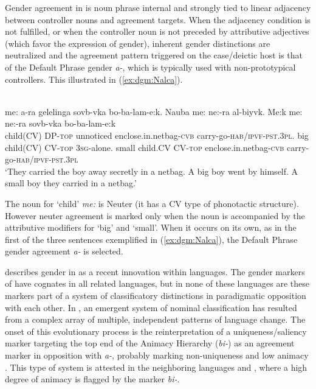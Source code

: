 \documentclass[output=collectionpaper]{langsci/langscibook}
\begin{document}
Gender agreement in  is noun phrase internal and strongly tied to linear adjacency between controller nouns and agreement targets. When the adjacency condition is not fulfilled, or when the controller noun is not preceded by attributive adjectives (which favor the expression of gender), inherent gender distinctions are neutralized and the agreement pattern triggered on the case/deictic host is that of the Default Phrase gender \textit{a-}, which is typically used with non-prototypical controllers. This illustrated in (\ref{ex:dgm:Nalca}).

\ea\label{ex:dgm:Nalca}
\\
\gll me: a-ra gelelinga sovb-vka bo-ba-lam-e:k. Nauba me: ne:-ra al-biyvk. Me:k me: ne:-ra sovb-vka bo-ba-lam-e:k\\
child(\textsc{CV}) \textsc{DP-top} unnoticed enclose.in.netbag-\textsc{cvb} carry-go-\textsc{hab/ipvf-pst.3pl}. big child(\textsc{CV}) \textsc{CV-top} \textsc{3sg-}alone. small child.\textsc{CV} \textsc{CV-top} enclose.in.netbag-\textsc{cvb} carry-go-\textsc{hab/ipvf-pst.3pl}\\
\glt `They carried the boy away secretly in a netbag. A big boy went by himself. A small boy they carried in a netbag.'\\
\z

The  noun for `child' \textit{me:} is Neuter (it has a CV type of phonotactic structure). However neuter agreement is marked only when the noun is accompanied by the attributive modifiers for `big' and `small'. When it occurs on its own, as in the first of the three sentences exemplified in (\ref{ex:dgm:Nalca}),  the Default Phrase gender agreement \textit{a-} is selected.


\citet{Waelchli2018} describes gender in  as a recent innovation within  languages. The gender markers of  have cognates in all related  languages, but in none of these languages are these markers part of a system of classificatory distinctions in paradigmatic opposition with each other. In , an emergent system of nominal classification has resulted from a complex array of multiple, independent patterns of language change. The onset of this evolutionary process is the reinterpretation of a uniqueness/saliency marker targeting the top end of the Animacy Hierarchy (\textit{bi-}) as an agreement marker in opposition with \textit{a-}, probably marking non-uniqueness and low animacy \citep{Waelchli2018}. This type of system is attested in the neighboring languages  and , where a high degree of animacy is flagged by the marker \textit{bi-}.
\end{document}
